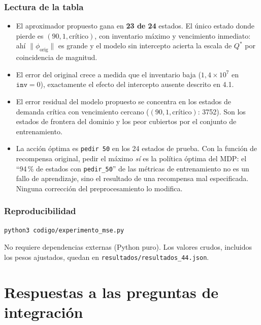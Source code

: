 \documentclass[11pt,letterpaper]{article}
\begin{document}
\subsubsection*{Lectura de la tabla}

\begin{itemize}[leftmargin=*]
  \item El aproximador propuesto gana en \textbf{23 de 24} estados. El único
        estado donde pierde es $(90,1,\text{crítico})$, con inventario máximo y
        vencimiento inmediato: ahí $\lVert\phi_{\text{orig}}\rVert$ es grande y el
        modelo sin intercepto acierta la escala de $Q^{*}$ por coincidencia de
        magnitud.
  \item El error del original crece a medida que el inventario baja
        ($1{,}4\times10^{7}$ en $\texttt{inv}=0$), exactamente el efecto del
        intercepto ausente descrito en 4.1.
  \item El error residual del modelo propuesto se concentra en los estados de
        demanda crítica con vencimiento cercano
        ($(90,1,\text{crítico})$: 3752). Son los estados de frontera del dominio y
        los peor cubiertos por el conjunto de entrenamiento.
  \item La acción óptima es \texttt{pedir 50} en los 24 estados de prueba. Con la
        función de recompensa original, pedir el máximo \emph{sí} es la política
        óptima del MDP: el ``94\,\% de estados con \texttt{pedir\_50}'' de las
        métricas de entrenamiento no es un fallo de aprendizaje, sino el resultado
        de una recompensa mal especificada. Ninguna corrección del preprocesamiento
        lo modifica.
\end{itemize}

\subsubsection*{Reproducibilidad}

\begin{lstlisting}[language=bash, numbers=none, caption={Reproducción de los resultados}]
python3 codigo/experimento_mse.py
\end{lstlisting}

\noindent
No requiere dependencias externas (Python puro). Los valores crudos, incluidos los
pesos ajustados, quedan en \texttt{resultados/resultados\_44.json}.

\clearpage
\section{Respuestas a las preguntas de integración}
\end{document}
